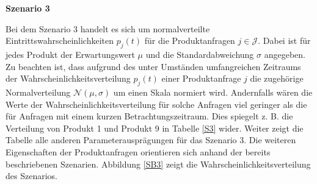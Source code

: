 \textbf{Szenario 3}

Bei dem Szenario 3 handelt es sich um normalverteilte Eintrittswahrscheinlichkeiten $p_j(t)$ für die Produktanfragen $j\in\mathcal{J}$. Dabei ist für jedes Produkt der Erwartungswert $\mu$ und die Standardabweichung $\sigma$ angegeben. Zu beachten ist, dass aufgrund des unter Umständen umfangreichen Zeitraums der Wahrscheinlichkeitsverteilung $p_j(t)$ einer Produktanfrage $j$ die zugehörige Normalverteilung $\mathcal{N}(\mu,\sigma)$ um einen Skala normiert wird. Andernfalls wären die Werte der Wahrscheinlichkeitsverteilung für solche Anfragen viel geringer als die für Anfragen mit einem kurzen Betrachtungszeitraum. Dies spiegelt z. B. die Verteilung von Produkt 1 und Produkt 9 in Tabelle \ref{S3} wider. Weiter zeigt die Tabelle alle anderen Parameterausprägungen für das Szenario 3. Die weiteren Eigenschaften der Produktanfragen orientieren sich anhand der bereits beschriebenen Szenarien. Abbildung \ref{SB3} zeigt die Wahrscheinlichkeitsverteilung des Szenarios.

